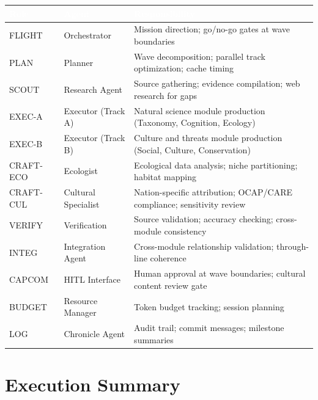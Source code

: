 \documentclass[11pt,letterpaper]{article}
\newcommand{\tableheader}[1]{\textbf{\sffamily\textcolor{white}{#1}}}
\begin{document}
\begin{center}
\begin{tabularx}{\textwidth}{L{2cm}L{2.5cm}X}
\toprule
{}
\tableheader{Role} & \tableheader{Agent} & \tableheader{Responsibility} \\
\midrule
FLIGHT & Orchestrator & Mission direction; go/no-go gates at wave boundaries \\
PLAN & Planner & Wave decomposition; parallel track optimization; cache timing \\
SCOUT & Research Agent & Source gathering; evidence compilation; web research for gaps \\
EXEC-A & Executor (Track A) & Natural science module production (Taxonomy, Cognition, Ecology) \\
EXEC-B & Executor (Track B) & Culture and threats module production (Social, Culture, Conservation) \\
CRAFT-ECO & Ecologist & Ecological data analysis; niche partitioning; habitat mapping \\
CRAFT-CUL & Cultural Specialist & Nation-specific attribution; OCAP\textregistered{}/CARE compliance; sensitivity review \\
VERIFY & Verification & Source validation; accuracy checking; cross-module consistency \\
INTEG & Integration Agent & Cross-module relationship validation; through-line coherence \\
CAPCOM & HITL Interface & Human approval at wave boundaries; cultural content review gate \\
BUDGET & Resource Manager & Token budget tracking; session planning \\
LOG & Chronicle Agent & Audit trail; commit messages; milestone summaries \\
\bottomrule
\end{tabularx}
\end{center}

\section{Execution Summary}
\end{document}
